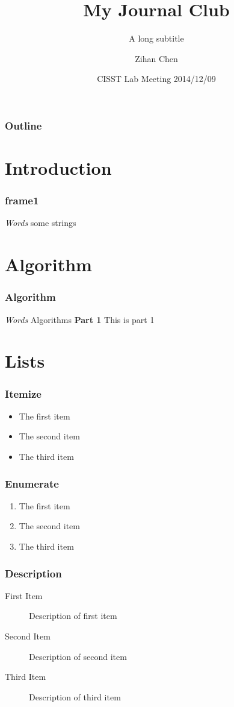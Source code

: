 \documentclass[12pt]{beamer}
\title[Journal Club]{My Journal Club}
\subtitle[short subtitle]{A long subtitle}
\date[2014]{CISST Lab Meeting 2014/12/09}
\author[Zihan Chen]{Zihan Chen}
\institute[JHU]{Johns Hopkins University}
\begin{document}
\begin{frame}
  \titlepage
\end{frame}

\begin{frame}
  \frametitle{Outline}
  \tableofcontents[part=1]
\end{frame}


\section{Introduction}
\begin{frame}
  \frametitle{frame1}
  \textit{Words} some strings
\end{frame}

\section{Algorithm}

\begin{frame}
  \frametitle{Algorithm}
  \textit{Words} Algorithms
  \textbf{Part 1} This is part 1

\end{frame}


\section{Lists}

\begin{frame}
  \frametitle{Itemize}
  \begin{itemize}
    \item The first item
    \item The second item
    \item The third item
  \end{itemize}
\end{frame}

\begin{frame}
  \frametitle{Enumerate}
  \begin{enumerate}
  \item The first item
  \item The second item
  \item The third item
  \end{enumerate}
\end{frame}

\begin{frame}
  \frametitle{Description}
  \transboxin
  \begin{description}
  \item[First Item] Description of first item
  \item[Second Item] Description of second item
  \item[Third Item] Description of third item
  \end{description}
\end{frame}
\end{document}
